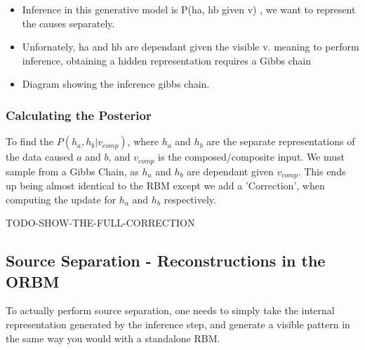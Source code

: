 \begin{itemize}
  \item Inference in this generative model is P(ha, hb given v) , we want to represent the causes separately.

  \item Unfornately, ha and hb are dependant given the visible v. meaning to perform inference, obtaining a hidden representation requires a Gibbs chain
  \item Diagram showing the inference gibbs chain.

\end{itemize}


\subsubsection{Calculating the Posterior}

To find the $ P(h_a, h_b | v_{comp}) $, where $h_a$ and $h_b$ are the separate representations of the data caused $a$ and $b$, and $v_{comp}$ is the composed/composite input. We must sample from a Gibbs Chain,  as $h_a$ and $h_b$ are dependant given $v_{comp}$. This ends up being almost identical to the RBM except we add a 'Correction', when computing the update for $h_a$ and $h_b$ respectively.

TODO-SHOW-THE-FULL-CORRECTION

\subsection{Source Separation - Reconstructions in the ORBM}

To actually perform source separation, one needs to simply take the internal representation generated by the inference step, and generate a visible pattern in the same way you would with a standalone RBM.
